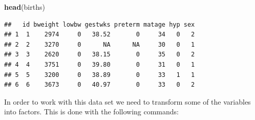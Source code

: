 \documentclass[
]{book}
\newenvironment{Shaded}{\begin{snugshade}}{\end{snugshade}}
\newcommand{\AttributeTok}[1]{\textcolor[rgb]{0.13,0.29,0.53}{#1}}
\newcommand{\ConstantTok}[1]{\textcolor[rgb]{0.56,0.35,0.01}{#1}}
\newcommand{\DecValTok}[1]{\textcolor[rgb]{0.00,0.00,0.81}{#1}}
\newcommand{\FunctionTok}[1]{\textcolor[rgb]{0.13,0.29,0.53}{\textbf{#1}}}
\newcommand{\NormalTok}[1]{#1}
\newcommand{\OtherTok}[1]{\textcolor[rgb]{0.56,0.35,0.01}{#1}}
\newcommand{\SpecialCharTok}[1]{\textcolor[rgb]{0.81,0.36,0.00}{\textbf{#1}}}
\newcommand{\StringTok}[1]{\textcolor[rgb]{0.31,0.60,0.02}{#1}}
\begin{document}
\begin{Shaded}
\begin{Highlighting}[]
\FunctionTok{head}\NormalTok{(births)}
\end{Highlighting}
\end{Shaded}

\begin{verbatim}
##   id bweight lowbw gestwks preterm matage hyp sex
## 1  1    2974     0   38.52       0     34   0   2
## 2  2    3270     0      NA      NA     30   0   1
## 3  3    2620     0   38.15       0     35   0   2
## 4  4    3751     0   39.80       0     31   0   1
## 5  5    3200     0   38.89       0     33   1   1
## 6  6    3673     0   40.97       0     33   0   2
\end{verbatim}

In order to work with this data set we need to transform some of the variables
into factors. This is done with the following commands:

\begin{Shaded}
\end{Shaded}
\end{document}
